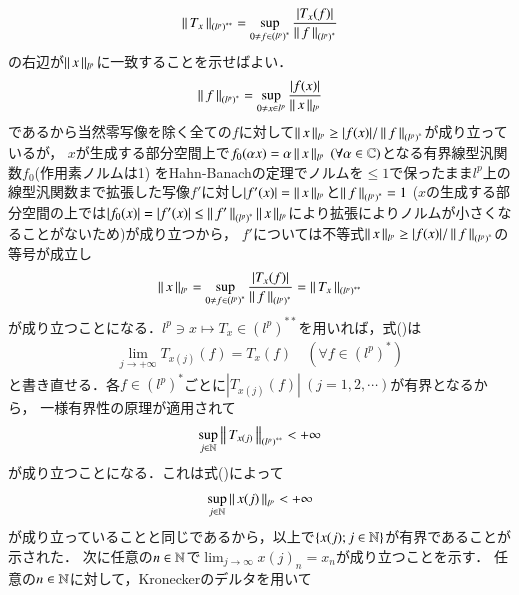\begin{prf}
\begin{description}
		\begin{align}
			\left\|\, T_x\, \right\|_{\left(l^p\right)^{**}} = \operatorname*{sup}_{0 \neq f \in \left(l^p\right)^*} \frac{|T_x(f)|}{\left\|\, f\, \right\|_{\left(l^p\right)^*}}
		\end{align}
		の右辺が$\left\|\, x\, \right\|_{l^p}$に一致することを示せばよい．
		\begin{align}
			\left\|\, f\, \right\|_{\left(l^p\right)^*} = \operatorname*{sup}_{0 \neq x \in l^p} \frac{|f(x)|}{\left\|\, x\, \right\|_{l^p}}
		\end{align}
		であるから当然零写像を除く全ての$f$に対して$\left\|\, x\, \right\|_{l^p} \geq |f(x)|/\left\|\, f\, \right\|_{\left(l^p\right)^*}$が成り立っているが，
		$x$が生成する部分空間上で$f_0(\alpha x) = \alpha \left\|\, x\, \right\|_{l^p}\ (\forall \alpha \in \mathbb{C})$となる有界線型汎関数$f_0$(作用素ノルムは1)
		をHahn-Banachの定理でノルムを$\leq 1$で保ったまま$l^p$上の線型汎関数まで拡張した写像$f'$に対し$|f'(x)| = \left\|\, x\, \right\|_{l^p}$と$\left\|\, f\, \right\|_{\left(l^p\right)^*} = 1$
		($x$の生成する部分空間の上では$|f_0(x)| = |f'(x)| \leq \left\|\, f'\, \right\|_{\left(l^p\right)^*} \left\|\, x\, \right\|_{l^p}$により拡張によりノルムが小さくなることがないため)が成り立つから，
		$f'$については不等式$\left\|\, x\, \right\|_{l^p} \geq |f(x)|/\left\|\, f\, \right\|_{\left(l^p\right)^*}$の等号が成立し
		\begin{align}
			\left\|\, x\, \right\|_{l^p} = \operatorname*{sup}_{0 \neq f \in \left(l^p\right)^*} \frac{|T_x(f)|}{\left\|\, f\, \right\|_{\left(l^p\right)^*}} = \left\|\, T_x\, \right\|_{\left(l^p\right)^{**}}
			\label{eq:func_analy_Q13_2}
		\end{align}
		が成り立つことになる．$l^p \ni x \longmapsto T_x \in \left(l^p\right)^{**}$を用いれば，式()は
		\begin{align}
			\lim_{j \to +\infty} T_{x(j)}(f) = T_x(f) \quad \left(\forall f \in \left(l^p\right)^*\right)
		\end{align}
		と書き直せる．各$f \in \left(l^p\right)^*$ごとに$\left|T_{x(j)}(f) \right|\ (j=1,2,\cdots)$が有界となるから，
		一様有界性の原理が適用されて
		\begin{align}
			\operatorname*{sup}_{j \in \mathbb{N}} \left\|\, T_{x(j)}\, \right\|_{\left(l^p\right)^{**}} < +\infty
		\end{align}
		が成り立つことになる．これは式()によって
		\begin{align}
			\operatorname*{sup}_{j \in \mathbb{N}} \left\|\, x(j)\, \right\|_{l^p} < +\infty
		\end{align}
		が成り立っていることと同じであるから，以上で$\left\{x(j);j\in\mathbb{N}\right\}$が有界であることが示された．
		次に任意の$n \in \mathbb{N}$で$\displaystyle \lim_{j \to \infty}x(j)_n = x_n$が成り立つことを示す．
		任意の$n \in \mathbb{N}$に対して，Kroneckerのデルタを用いて
		\begin{align}

\end{align}
\end{description}
\end{prf}
